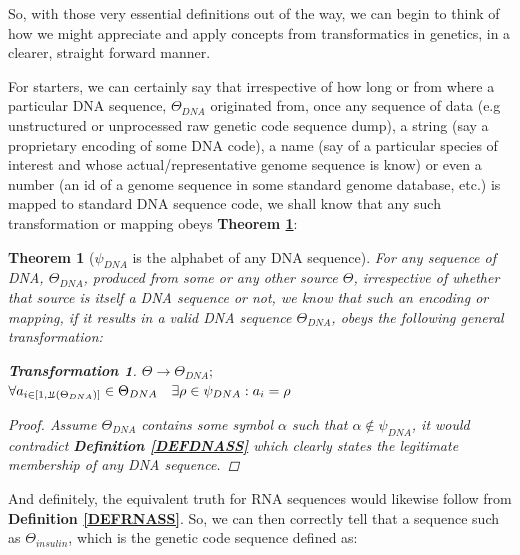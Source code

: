 \documentclass[a4paper, 18pt]{article} %
\newtheorem{theo}{Theorem}
\newtheorem{trans}{Transformation}
\newcommand{\invpi}{\rotatebox[origin=c]{180}{$\pi$}}
\begin{document}
So, with those very essential definitions out of the way, we can begin to think of how we might appreciate and apply concepts from transformatics in genetics, in a clearer, straight forward manner.

For starters, we can certainly say that irrespective of how long or from where a particular DNA sequence, $\Theta_{DNA}$ originated from, once any sequence of data (e.g unstructured or unprocessed raw genetic code sequence dump), a string (say a proprietary encoding of some DNA code), a name (say of a particular species of interest and whose actual/representative genome sequence is know) or even a number (an id of a genome sequence in some standard genome database, etc.) is mapped to standard DNA sequence code, we shall know that any such transformation or mapping obeys \textbf{Theorem \ref{THEODNA}}:

\begin{theo}[$\psi_{DNA}$ is the alphabet of any DNA sequence]
\label{THEODNA}
For any sequence of DNA, $\Theta_{DNA}$, produced from some or any other source $\Theta$, irrespective of whether that source is itself a DNA sequence or not, we know that such an encoding or mapping, if it results in a valid DNA sequence $\Theta_{DNA}$, obeys the following general transformation:\\

\begin{trans}
\label{TRANSmDNA}
$\Theta \rightarrow \Theta_{DNA};$\\
$\forall a_{i \in [1,\invpi(\Theta_{DNA})]} \in \Theta_{DNA} \quad \exists \rho \in \psi_{DNA}: a_i = \rho$
\end{trans}

\begin{proof}
Assume $\Theta_{DNA}$ contains some symbol $\alpha$ such that $\alpha \not\in \psi_{DNA}$, it would contradict \textbf{Definition \ref{DEFDNASS}} which clearly states the legitimate membership of any DNA sequence.
\end{proof}

\end{theo}


And definitely, the equivalent truth for RNA sequences would likewise follow from \textbf{Definition \ref{DEFRNASS}}. So, we can then correctly tell that a sequence such as $\Theta_{insulin}$, which is the genetic code sequence defined as:\\
\end{document}
